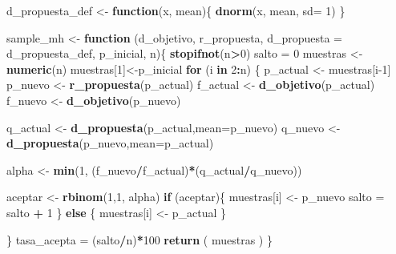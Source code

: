\documentclass[
]{article}
\newenvironment{Shaded}{\begin{snugshade}}{\end{snugshade}}
\newcommand{\AttributeTok}[1]{\textcolor[rgb]{0.13,0.29,0.53}{#1}}
\newcommand{\ControlFlowTok}[1]{\textcolor[rgb]{0.13,0.29,0.53}{\textbf{#1}}}
\newcommand{\DecValTok}[1]{\textcolor[rgb]{0.00,0.00,0.81}{#1}}
\newcommand{\FunctionTok}[1]{\textcolor[rgb]{0.13,0.29,0.53}{\textbf{#1}}}
\newcommand{\NormalTok}[1]{#1}
\newcommand{\OtherTok}[1]{\textcolor[rgb]{0.56,0.35,0.01}{#1}}
\newcommand{\SpecialCharTok}[1]{\textcolor[rgb]{0.81,0.36,0.00}{\textbf{#1}}}
\begin{document}
\begin{Shaded}
\begin{Highlighting}[]
\NormalTok{d\_propuesta\_def }\OtherTok{\textless{}{-}} \ControlFlowTok{function}\NormalTok{(x, mean)\{}
  \FunctionTok{dnorm}\NormalTok{(x, mean, }\AttributeTok{sd=} \DecValTok{1}\NormalTok{)}
\NormalTok{\}}

\NormalTok{sample\_mh }\OtherTok{\textless{}{-}} \ControlFlowTok{function}\NormalTok{ (d\_objetivo, r\_propuesta, }\AttributeTok{d\_propuesta =}\NormalTok{ d\_propuesta\_def, p\_inicial, n)\{}
  \FunctionTok{stopifnot}\NormalTok{(n}\SpecialCharTok{\textgreater{}}\DecValTok{0}\NormalTok{)}
\NormalTok{  salto }\OtherTok{=} \DecValTok{0}
\NormalTok{  muestras }\OtherTok{\textless{}{-}} \FunctionTok{numeric}\NormalTok{(n)}
\NormalTok{  muestras[}\DecValTok{1}\NormalTok{]}\OtherTok{\textless{}{-}}\NormalTok{p\_inicial}
  \ControlFlowTok{for}\NormalTok{ (i }\ControlFlowTok{in} \DecValTok{2}\SpecialCharTok{:}\NormalTok{n) \{}
\NormalTok{    p\_actual }\OtherTok{\textless{}{-}}\NormalTok{ muestras[i}\DecValTok{{-}1}\NormalTok{]}
\NormalTok{    p\_nuevo }\OtherTok{\textless{}{-}} \FunctionTok{r\_propuesta}\NormalTok{(p\_actual)}
\NormalTok{    f\_actual }\OtherTok{\textless{}{-}} \FunctionTok{d\_objetivo}\NormalTok{(p\_actual)}
\NormalTok{    f\_nuevo }\OtherTok{\textless{}{-}} \FunctionTok{d\_objetivo}\NormalTok{(p\_nuevo)}
    
\NormalTok{    q\_actual }\OtherTok{\textless{}{-}} \FunctionTok{d\_propuesta}\NormalTok{(p\_actual,}\AttributeTok{mean=}\NormalTok{p\_nuevo)}
\NormalTok{    q\_nuevo }\OtherTok{\textless{}{-}} \FunctionTok{d\_propuesta}\NormalTok{(p\_nuevo,}\AttributeTok{mean=}\NormalTok{p\_actual)}
    
\NormalTok{    alpha }\OtherTok{\textless{}{-}} \FunctionTok{min}\NormalTok{(}\DecValTok{1}\NormalTok{, (f\_nuevo}\SpecialCharTok{/}\NormalTok{f\_actual)}\SpecialCharTok{*}\NormalTok{(q\_actual}\SpecialCharTok{/}\NormalTok{q\_nuevo))}
    
\NormalTok{    aceptar }\OtherTok{\textless{}{-}} \FunctionTok{rbinom}\NormalTok{(}\DecValTok{1}\NormalTok{,}\DecValTok{1}\NormalTok{, alpha)}
    \ControlFlowTok{if}\NormalTok{ (aceptar)\{}
\NormalTok{      muestras[i] }\OtherTok{\textless{}{-}}\NormalTok{ p\_nuevo}
\NormalTok{      salto }\OtherTok{=}\NormalTok{ salto }\SpecialCharTok{+} \DecValTok{1}  
\NormalTok{    \} }\ControlFlowTok{else}\NormalTok{ \{}
\NormalTok{      muestras[i] }\OtherTok{\textless{}{-}}\NormalTok{ p\_actual}
\NormalTok{    \}}
    
\NormalTok{  \}}
\NormalTok{  tasa\_acepta }\OtherTok{=}\NormalTok{ (salto}\SpecialCharTok{/}\NormalTok{n)}\SpecialCharTok{*}\DecValTok{100}
  \FunctionTok{return}\NormalTok{ ( muestras )}
\NormalTok{\}}
\end{Highlighting}
\end{Shaded}
\end{document}
